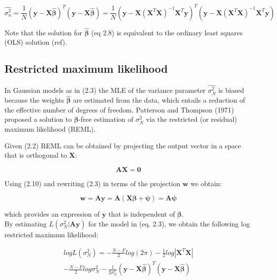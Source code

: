 \begin{equation} \label{eq9:Linear_regression_MLE_solution_sigma}
 \hat{\sigma_n^2} = \frac{1}{N}(\mathbf{y}-\mathbf{X}\hat{\boldsymbol{\beta}})^T(\mathbf{y}-\mathbf{X}\hat{\boldsymbol{\beta}}) = \frac{1}{N}(\mathbf{y}-\mathbf{X}(\mathbf{X}^T\mathbf{X})^{-1}\mathbf{X}^T\mathbf{y})^T(\mathbf{y}-\mathbf{X}(\mathbf{X}^T\mathbf{X})^{-1}\mathbf{X}^T\mathbf{y}) 
\end{equation}

Note that the solution for $\hat{\boldsymbol{\beta}}$ (eq 2.8) is equivalent to the ordinary least squares (OLS) solution (ref).


\subsection{Restricted maximum likelihood}

In Gaussian models as in (2.3) the MLE of the variance parameter $\hat{\sigma_N^2}$ is biased because the weights $\hat{\boldsymbol{\beta}}$ are estimated from the data, which entails a reduction of the effective number of degrees of freedom.
Patterson and Thompson (1971) proposed a solution to $\boldsymbol{\beta}$-free estimation of $\sigma_N^2$ via the restricted (or residual) maximum likelihood (REML).

Given (2.2) REML can be obtained by projecting the output vector in a space that is orthogonal to $\mathbf{X}$:

\begin{equation}
    \mathbf{A}\mathbf{X} = \mathbf{0}
\end{equation}

Using (2.10) and rewriting (2.3) in terms of the projection $\mathbf{w}$ we obtain:

\begin{equation}
    \mathbf{w} = \mathbf{A}\mathbf{y} = \mathbf{A}(\mathbf{X}\boldsymbol{\beta} + \boldsymbol{\psi}) = \mathbf{A}\boldsymbol{\psi}
\end{equation}

which provides an expression of $\mathbf{y}$ that is independent of $\boldsymbol{\beta}$.\\

By estimating $L(\sigma_N^2 | \mathbf{A}\mathbf{y} )$ for the model in (eq. 2.3), we obtain the following log restricted maximum likelihood:

\begin{equation} \label{eq10:Linear_regression_log_restricted_likelihood}
\begin{split}
logL(\sigma_N^2) = -\frac{N-F}{2}log(2\pi) - \frac{1}{2}log|\mathbf{X}^T\mathbf{X}| \\
-  \frac{N-F}{2}log\sigma_N^2 - \frac{1}{2\sigma_N^2}(\mathbf{y}-\mathbf{X}\hat{\boldsymbol{\beta}})^T(\mathbf{y}-\mathbf{X}\hat{\boldsymbol{\beta}})  
\end{split}
\end{equation}

